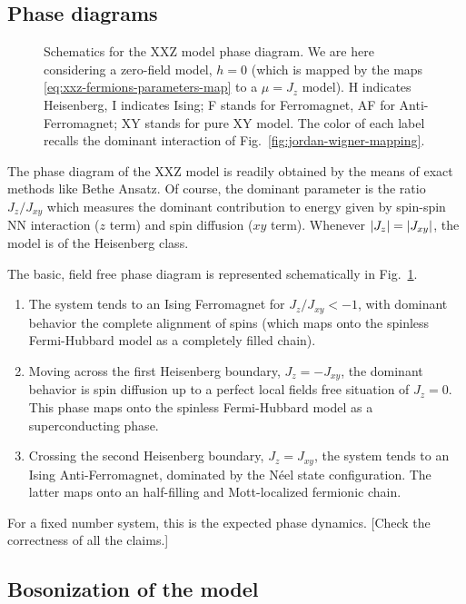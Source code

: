 \subsection*{Phase diagrams}

\begin{figure}
	\centering
	
	\caption{Schematics for the $\mathrm{XXZ}$ model phase diagram. We are here considering a zero-field model, $h=0$ (which is mapped by the maps \eqref{eq:xxz-fermions-parameters-map} to a $\mu = J_z$ model). H indicates Heisenberg, I indicates Ising; F stands for Ferromagnet, AF for Anti-Ferromagnet; XY stands for pure $\mathrm{XY}$ model. The color of each label recalls the dominant interaction of Fig.~\ref{fig:jordan-wigner-mapping}.}
	\label{fig:xxz-phase-diagram}
\end{figure}

The phase diagram of the $\mathrm{XXZ}$ model is readily obtained by the means of exact methods like Bethe Ansatz. Of course, the dominant parameter is the ratio $J_z/J_{xy}$ which measures the dominant contribution to energy given by spin-spin NN interaction ($z$ term) and spin diffusion ($xy$ term). Whenever $\abs{J_z} = \abs{J_{xy}}$, the model is of the Heisenberg class.

The basic, field free phase diagram is represented schematically in Fig.~\ref{fig:xxz-phase-diagram}.
\begin{enumerate}
	\item The system tends to an Ising Ferromagnet for $J_z / J_{xy} < -1$, with dominant behavior the complete alignment of spins (which maps onto the spinless Fermi-Hubbard model as a completely filled chain). 
	\item Moving across the first Heisenberg boundary, $J_z = - J_{xy}$, the dominant behavior is spin diffusion up to a perfect local fields free situation of $J_z = 0$. This phase maps onto the spinless Fermi-Hubbard model as a superconducting phase.
	\item Crossing the second Heisenberg boundary, $J_z = J_{xy}$, the system tends to an Ising Anti-Ferromagnet, dominated by the Néel state configuration. The latter maps onto an half-filling and Mott-localized fermionic chain.
\end{enumerate}
For a fixed number system, this is the expected phase dynamics.
{\color{tabred}[Check the correctness of all the claims.]}

\subsection{Bosonization of the model}

\todo